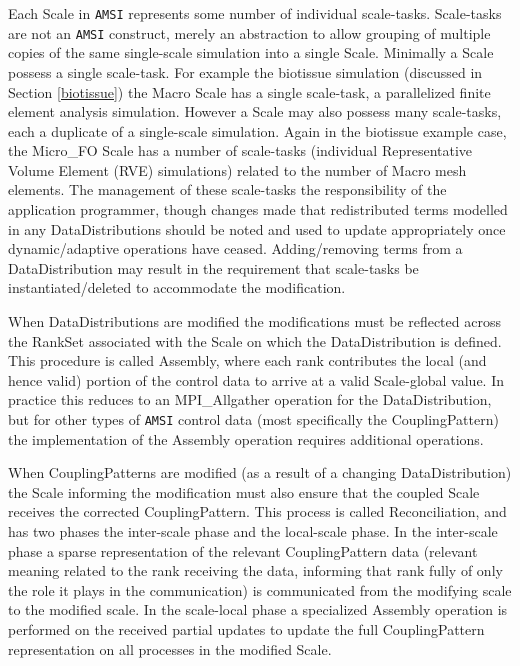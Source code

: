 \documentclass[11pt]{article}
\begin{document}
Each Scale in \verb|AMSI| represents some number of individual scale-tasks.
Scale-tasks are not an \verb|AMSI| construct, merely an abstraction to allow grouping of multiple copies of the same single-scale simulation into a single Scale.
Minimally a Scale possess a single scale-task.
For example the biotissue simulation (discussed in Section \ref{biotissue}) the Macro Scale has a single scale-task, a parallelized finite element analysis simulation.
However a Scale may also possess many scale-tasks, each a duplicate of a single-scale simulation.
Again in the biotissue example case, the Micro\_FO Scale has a number of scale-tasks (individual Representative Volume Element (RVE) simulations) related to the number of Macro mesh elements.
The management of these scale-tasks the responsibility of the application programmer, though changes made that redistributed terms modelled in any DataDistributions should be noted and used to update appropriately once dynamic/adaptive operations have ceased.
Adding/removing terms from a DataDistribution may result in the requirement that scale-tasks be instantiated/deleted to accommodate the modification.

When DataDistributions are modified the modifications must be reflected across the RankSet associated with the Scale on which the DataDistribution is defined.
This procedure is called Assembly, where each rank contributes the local (and hence valid) portion of the control data to arrive at a valid Scale-global value.
In practice this reduces to an MPI\_Allgather operation for the DataDistribution, but for other types of \verb|AMSI| control data (most specifically the CouplingPattern) the implementation of the Assembly operation requires additional operations.

When CouplingPatterns are modified (as a result of a changing DataDistribution) the Scale informing the modification must also ensure that the coupled Scale receives the corrected CouplingPattern.
This process is called Reconciliation, and has two phases the inter-scale phase and the local-scale phase.
In the inter-scale phase a sparse representation of the relevant CouplingPattern data (relevant meaning related to the rank receiving the data, informing that rank fully of only the role it plays in the communication) is communicated from the modifying scale to the modified scale.
In the scale-local phase a specialized Assembly operation is performed on the received partial updates to update the full CouplingPattern representation on all processes in the modified Scale.
\end{document}
